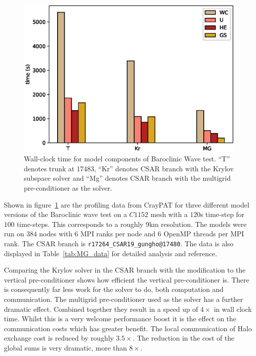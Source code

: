 \begin{figure}[ht!]
\centering\includegraphics[width=1.0\linewidth]{figs/mg-improvement.eps}
\caption{\label{fig:mg}Wall-clock time for model components of
  Baroclinic Wave test. ``T'' denotes trunk at 17483, ``Kr'' denotes
  CSAR branch with the Krylov subspace solver and ``Mg'' denotes
  CSAR branch with the multigrid pre-conditioner as the solver.}
\end{figure} 

Shown in figure~\ref{fig:mg}
are the profiling data from CrayPAT for three different model versions
of the Baroclinic wave test on a $C1152$ mesh with a $120$s time-step
for $100$ time-steps. This corresponds to a roughly 9km
resolution. The models were run on $384$ nodes with $6$ MPI ranks per
node and $6$ OpenMP threads per MPI rank.  The CSAR branch is
\verb+r17264_CSAR19_gungho@17480+. The data is also displayed in
Table~\ref{tab:MG_data} for detailed analysis and reference.

Comparing the Krylov solver in the CSAR branch with the modification
to the vertical pre-conditioner shows how efficient the vertical
pre-conditioner is. There is consequently far less work for the solver
to do, both computation and communication. The multigrid
pre-conditioner used as the solver has a further dramatic
effect. Combined together they result in a speed up of $4 \times $ in
wall clock time. Whilst this is a very welcome performance boost it is
the effect on the communication costs which has greater benefit. The
local communication of Halo exchange cost is reduced by roughly
$3.5 \times $. The reduction in the cost of the global sums is very
dramatic, more than $8 \times$. 

